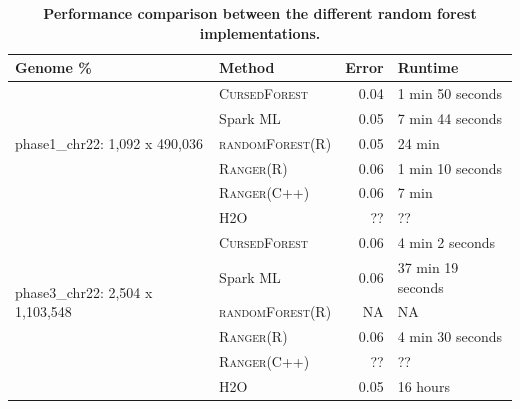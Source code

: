 \documentclass[10pt,letterpaper]{article}
\newcommand{\cursedforest}{\textsc{CursedForest}\xspace}
\newcommand{\ranger}{\textsc{Ranger}\xspace}
\newcommand{\randomforest}{\textsc{randomForest}\xspace}
\begin{document}
\begin{table}[!ht]
\begin{minipage}{\textwidth}
\centering
\caption{ {\bf Performance comparison between the different random forest implementations.}}
\begin{tabular}{| l | l | r | l |}
\hline
\bf{Genome \%}                      & \bf{Method} & \bf{Error}  & \bf{Runtime}  \\

\hline

\multirow{5}{*}{phase1\_chr22: 1,092 x 490,036} & \cursedforest & 0.04  & 1 min 50 seconds                        \\
                                                & Spark ML  &  0.05           &           7 min 44 seconds         \\
                                                & \randomforest (R)         & 0.05       & 24 min           \\
                                                & \ranger (R)      & 0.06       & 1 min 10 seconds       \\
                                                & \ranger (C++)     & 0.06       & 7 min            \\
                                                & H2O           & ??       & ??         \\

\hline

\multirow{5}{*}{phase3\_chr22: 2,504 x 1,103,548}   & \cursedforest & 0.06 & 4 min 2 seconds \\
                                                    & Spark ML  & 0.06 & 37 min 19 seconds \\
                                                    & \randomforest (R)        & NA         & NA                \\
                                                    & \ranger (R)    & 0.06       & 4 min 30 seconds     \\
                                                    & \ranger (C++)     &     ??   & ??        \\
                                                    & H2O           & 0.05       & 16 hours         \\

\hline


\end{tabular}
\end{minipage}
\end{table}
\end{document}
